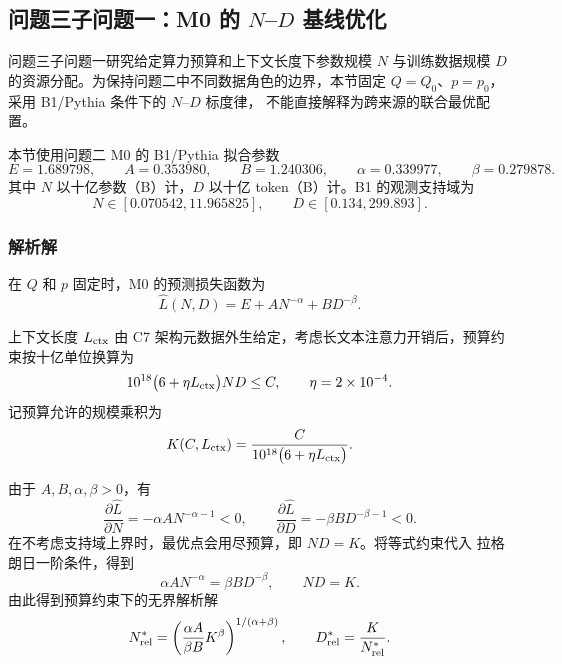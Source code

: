 
\subsection{问题三子问题一：M0 的 $N$--$D$ 基线优化}
\label{sec:q3-m0-nd}

问题三子问题一研究给定算力预算和上下文长度下参数规模 $N$ 与训练数据规模
$D$ 的资源分配。为保持问题二中不同数据角色的边界，本节固定
$Q=Q_0$、$p=p_0$，采用 B1/Pythia 条件下的 $N$--$D$ 标度律，
不能直接解释为跨来源的联合最优配置。

本节使用问题二 M0 的 B1/Pythia 拟合参数
\[
E=1.689798,\qquad
A=0.353980,\qquad
B=1.240306,\qquad
\alpha=0.339977,\qquad
\beta=0.279878 .
\]
其中 $N$ 以十亿参数（B）计，$D$ 以十亿 token（B）计。B1 的观测支持域为
\[
N\in[0.070542,11.965825],\qquad
D\in[0.134,299.893].
\]

\subsubsection{解析解}
\label{sec:q3-m0-nd-analytic}

在 $Q$ 和 $p$ 固定时，M0 的预测损失函数为
\begin{equation}
\widehat L(N,D)=E+A N^{-\alpha}+B D^{-\beta}.
\label{eq:q3-m0-loss}
\end{equation}

上下文长度 $L_{\rm ctx}$ 由 C7 架构元数据外生给定，考虑长文本注意力开销后，预算约束按十亿单位换算为
\begin{equation}
10^{18}\bigl(6+\eta L_{\rm ctx}\bigr)ND\le C,
\qquad \eta=2\times10^{-4}.
\label{eq:q3-m0-budget}
\end{equation}
记预算允许的规模乘积为
\begin{equation}
K(C,L_{\rm ctx})
=\frac{C}{10^{18}\bigl(6+\eta L_{\rm ctx}\bigr)}.
\label{eq:q3-m0-k}
\end{equation}

由于 $A,B,\alpha,\beta>0$，有
\begin{equation}
\frac{\partial \widehat L}{\partial N}
=-\alpha A N^{-\alpha-1}<0,\qquad
\frac{\partial \widehat L}{\partial D}
=-\beta B D^{-\beta-1}<0.
\label{eq:q3-m0-first-derivative}
\end{equation}
在不考虑支持域上界时，最优点会用尽预算，即 $ND=K$。将等式约束代入
拉格朗日一阶条件，得到
\begin{equation}
\alpha A N^{-\alpha}=\beta B D^{-\beta},
\qquad ND=K .
\label{eq:q3-m0-balance}
\end{equation}
由此得到预算约束下的无界解析解
\begin{equation}
N_{\rm rel}^{*}
=\left(\frac{\alpha A}{\beta B}K^{\beta}\right)^{1/(\alpha+\beta)},
\qquad
D_{\rm rel}^{*}=\frac{K}{N_{\rm rel}^{*}} .
\label{eq:q3-m0-analytic-solution}
\end{equation}

